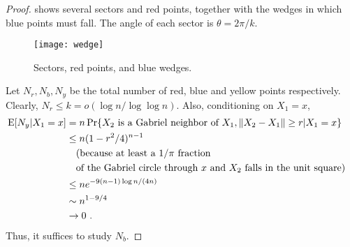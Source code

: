 \documentclass[lotsofwhite,charterfonts]{patmorin}
\newcommand{\PROB}{\Pr}
\newcommand{\EXP}{\mathrm{E}}
\begin{document}
\begin{proof}
shows several sectors and red points, together
with the wedges in which blue points must
fall. The angle of each sector is $\theta = 2\pi / k$.

\begin{figure}
  \begin{center}
    \texttt{[image: wedge]}
  \end{center}
  \caption{Sectors, red points, and blue wedges.}
\end{figure}

Let $N_r , N_b, N_y$ be the total number of red, blue and yellow
points respectively.
Clearly, $N_r \le k = o(\log n /\log \log n)$.
Also, conditioning on $X_1 = x$,
\[
\begin{aligned}
\EXP [N_y | X_1 = x] 
&= n \PROB \{ X_2 ~\hbox{\rm is a Gabriel neighbor of}~ X_1 , \| X_2 - X_1 \| \ge r | X_1 = x \} \cr
&\le n (1-r^2/4)^{n-1} \cr
&\quad \hbox{\rm (because at least a $1/\pi$ fraction} \cr
&\quad \hbox{\rm of the Gabriel circle through $x$ and $X_2$ falls in the unit square)} \cr
&\le n e^{-9(n-1) \log n / (4 n)} \cr
&\sim n^{1-9/4} \cr
&\to 0~. \cr
\end{aligned}
\]
Thus, it suffices to study $N_b$.


\end{proof}
\end{document}
